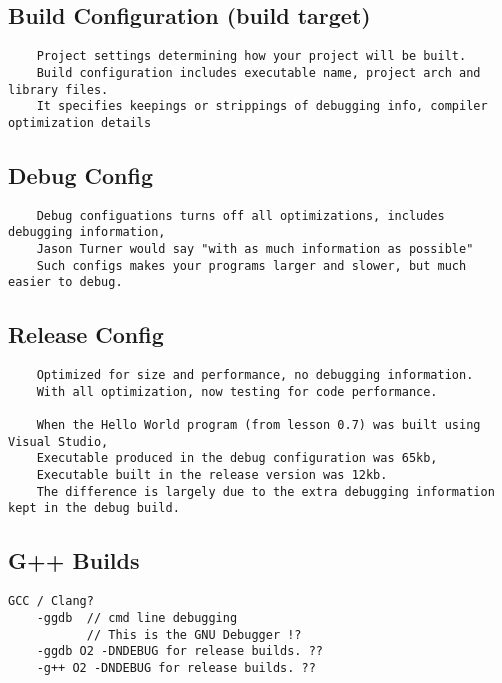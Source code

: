 \subsection{Build Configuration (build target)}

\begin{verbatim}
    Project settings determining how your project will be built. 
    Build configuration includes executable name, project arch and library files. 
    It specifies keepings or strippings of debugging info, compiler optimization details 
\end{verbatim}

\subsection{Debug Config}

\begin{verbatim}
    Debug configuations turns off all optimizations, includes debugging information,
    Jason Turner would say "with as much information as possible"
    Such configs makes your programs larger and slower, but much easier to debug. 
\end{verbatim}

\subsection{Release Config}

\begin{verbatim}
    Optimized for size and performance, no debugging information.
    With all optimization, now testing for code performance.

    When the Hello World program (from lesson 0.7) was built using Visual Studio,
    Executable produced in the debug configuration was 65kb, 
    Executable built in the release version was 12kb. 
    The difference is largely due to the extra debugging information kept in the debug build.
\end{verbatim}

\subsection{G++ Builds}
\begin{verbatim}
GCC / Clang? 
    -ggdb  // cmd line debugging
           // This is the GNU Debugger !?
    -ggdb O2 -DNDEBUG for release builds. ??
    -g++ O2 -DNDEBUG for release builds. ??
\end{verbatim}

